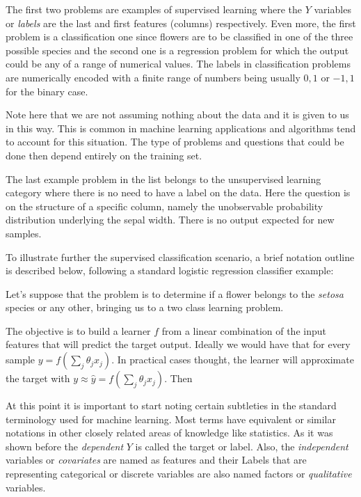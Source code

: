 The first two problems are examples of supervised learning where the $Y$ variables or \textit{labels} are the last and first features (columns) respectively. Even more, the first problem is a classification one since flowers are to be classified in one of the three possible species and the second one is a regression problem for which the output could be any of a range of numerical values. The labels in classification problems are numerically encoded with a finite range of numbers being usually ${0,1}$ or ${-1,1}$ for the binary case.

Note here that we are not assuming nothing about the data and it is given to us in this way. This is common in machine learning applications and algorithms tend to account for this situation. The type of problems and questions that could be done then depend entirely on the training set. 

The last example problem in the list belongs to the unsupervised learning category where there is no need to have a label on the data. Here the question is on the structure of a specific column, namely the unobservable probability distribution underlying the sepal width. There is no output expected for new samples.

To illustrate further the supervised classification scenario, a brief notation outline is described below, following a standard logistic regression classifier example:

Let's suppose that the problem is to determine if a flower belongs to the \textit{setosa} species or any other, bringing us to a two class learning problem.
 
The objective is to build a learner $f$ from a linear combination of the input features that will predict the target output. Ideally we would have that for every sample $y =  f(\sum_{j}\theta_jx_j)$. In practical cases thought, the learner will approximate the target with $y \approx \hat{y} = f(\sum_{j}\theta_jx_j)$. Then 

At this point it is important to start noting certain subtleties in the standard terminology used for machine learning. Most terms have equivalent or similar notations in other closely related areas of knowledge like statistics. As it was shown before the \textit{dependent} $Y$ is called the target or label. Also, the \textit{independent} variables or \textit{covariates} are named as features and their 
Labels that are representing categorical or discrete variables are also named factors or \textit{qualitative} variables. 




